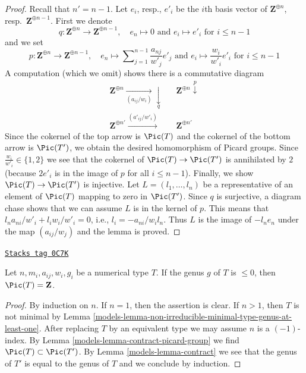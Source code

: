 \begin{proof}
Recall that $n' = n - 1$. Let $e_i$, resp., $e'_i$ be the $i$th
basis vector of $\mathbf{Z}^{\oplus n}$, resp.\ $\mathbf{Z}^{\oplus n - 1}$.
First we denote
$$
q : \mathbf{Z}^{\oplus n} \to \mathbf{Z}^{\oplus n - 1},
\quad e_n \mapsto 0\text{ and }e_i \mapsto e'_i\text{ for }i \leq n - 1
$$
and we set
$$
p : \mathbf{Z}^{\oplus n} \to \mathbf{Z}^{\oplus n - 1},\quad
e_n \mapsto \sum\nolimits_{j = 1}^{n - 1} \frac{a_{nj}}{w'_j} e'_j
\text{ and }
e_i \mapsto \frac{w_i}{w'_i} e'_i\text{ for }i \leq n - 1
$$
A computation (which we omit) shows there is a commutative diagram
$$
\begin{array}{ccc}\mathbf{Z}^{\oplus n} \underset{(a_{ij}/w_i)}{\longrightarrow}\underset{q}{\downarrow} &  & \mathbf{Z}^{\oplus n} \overset{p}{\downarrow} \\ \mathbf{Z}^{\oplus n'} \overset{(a'_{ij}/w'_i)}{\longrightarrow} &  & \mathbf{Z}^{\oplus n'}\end{array}
$$
Since the cokernel of the top arrow is
$\Pic(T)$ and the cokernel of the bottom arrow
is $\Pic(T')$, we obtain the desired homomorphism
of Picard groups. Since $\frac{w_i}{w'_i} \in \{1, 2\}$
we see that the cokernel of $\Pic(T) \to \Pic(T')$
is annihilated by $2$ (because $2e'_i$ is in the image of $p$
for all $i \leq n - 1$).
Finally, we show $\Pic(T) \to \Pic(T')$ is injective.
Let $L = (l_1, \ldots, l_n)$ be a representative
of an element of $\Pic(T)$ mapping to zero in $\Pic(T')$.
Since $q$ is surjective, a diagram chase shows that we can assume
$L$ is in the kernel of $p$. This means that
$l_na_{ni}/w'_i + l_iw_i/w'_i = 0$, i.e., $l_i = - a_{ni}/w_i l_n$.
Thus $L$ is the image of $-l_ne_n$ under the map $(a_{ij}/w_j)$
and the lemma is proved.
\end{proof}

\begin{lemma}
\label{models-lemma-picard-group-genus-nonpositive}
\href{https://stacks.math.columbia.edu/tag/0C7K}{\texttt{Stacks tag 0C7K}}

Let $n, m_i, a_{ij}, w_i, g_i$ be a numerical type $T$.
If the genus $g$ of $T$ is $\leq 0$, then $\Pic(T) = \mathbf{Z}$.
\end{lemma}

\begin{proof}

By induction on $n$. If $n = 1$, then the assertion is clear.
If $n > 1$, then $T$ is not minimal by
Lemma \ref{models-lemma-non-irreducible-minimal-type-genus-at-least-one}.
After replacing $T$ by an equivalent type
we may assume $n$ is a $(-1)$-index.
By Lemma \ref{models-lemma-contract-picard-group}
we find $\Pic(T) \subset \Pic(T')$.
By Lemma \ref{models-lemma-contract} we see that the genus
of $T'$ is equal to the genus of $T$ and we conclude by
induction.
\end{proof}

